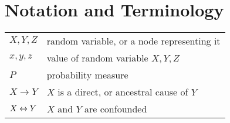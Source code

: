 \newpage
\section*{Notation and Terminology}

\begin{tabular}{ll}

$X, Y, Z$           & random variable, or a node representing it \\
$x, y, z$           & value of random variable $X, Y, Z$ \\
$P$                 & probability measure \\
$X\to Y$            & $X$ is a direct, or ancestral cause of $Y$ \\
$X\leftrightarrow Y$           & $X$ and $Y$ are confounded



\end{tabular}